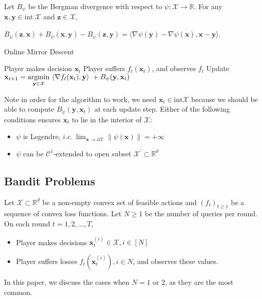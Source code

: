 \documentclass[12pt, a4paper]{report}
\begin{document}
\begin{prop}
Let $B_{\psi}$ be the Bergman divergence with respect to $\psi : \mathcal{X} \rightarrow \mathbb{R}$. For any $\mathbf{x}, \mathbf{y} \in \mathrm{int}\ \mathcal{X}$ and $\mathbf{z} \in \mathcal{X}$, 
\begin{center}
$B_{\psi}(\mathbf{z}, \mathbf{x}) + B_{\psi}(\mathbf{x}, \mathbf{y}) - B_{\psi}(\mathbf{z}, \mathbf{y}) = \langle \nabla \psi(\mathbf{y}) - \nabla \psi(\mathbf{x}), \mathbf{x} - \mathbf{y} \rangle$.
\end{center}
\end{prop}
\begin{algorithm}
\caption{Online Mirror Descent}
\begin{algorithmic}
\State Player makes decision $\mathbf{x}_t$
\State Player suffers $f_t(\mathbf{x}_t)$, and observes $f_t$
\State Update $\displaystyle \mathbf{x}_{t+1} = \operatorname*{argmin}_{\mathbf{y} \in \mathcal{X}}\ \langle \nabla f_t(\mathbf{x}_t), \mathbf{y} \rangle\ + B_{\psi}(\mathbf{y}, \mathbf{x}_t)$
\EndFor
\end{algorithmic}
\end{algorithm}
\begin{rem}
Note in order for the algorithm to work, we need $\mathbf{x}_{t} \in \mathrm{int} \mathcal{X}$ because we should be able to compute $B_\psi(\mathbf{y}, \mathbf{x}_t)$ at each update step. Either of the following conditions ensures $\mathbf{x}_t$ to lie in the interior of $\mathcal{X}$:
\begin{itemize}
    \item $\psi$ is Legendre, $i.e.\ \lim_{\mathbf{x} \rightarrow \partial \mathcal{X}} \lVert \psi(\mathbf{x}) \rVert = +\infty$
    \item $\psi$ can be $\mathcal{C}^1$-extended to open subset $\mathcal{X}^{\prime} \subset \mathbb{R}^d$
\end{itemize}
\end{rem}

\subsection{Bandit Problems}

\begin{defn}  Let $\mathcal{X} \subset \mathbb{R}^d$ be a non-empty convex set of feasible actions and $(f_t)_{t \geq 1}$ be a sequence of convex loss functions. Let $N \geq 1$ be the number of queries per round. On each round $t = 1, 2, ..., T$,
\begin{itemize}
    \item Player makes decisions $\mathbf{x}_t^{(i)} \in \mathcal{X}, i \in [N]$
    \item Player suffers losses $f_t(\mathbf{x}_t^{(i)}), i \in N$, and observes these values.
\end{itemize}
\end{defn}
In this paper, we discuss the cases when $N = 1$ or $2$, as they are the most common. 
\end{document}
